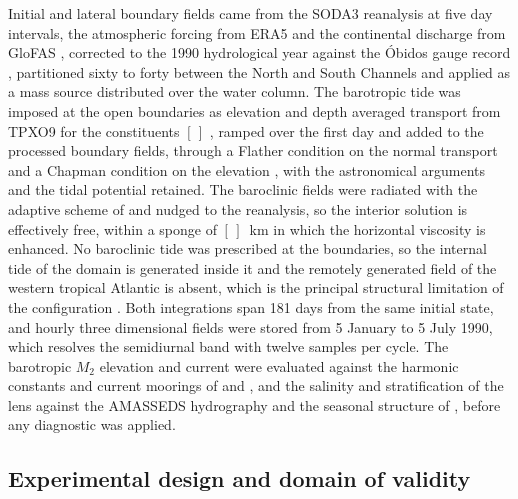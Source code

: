 \documentclass[a4paper,fleqn]{cas-sc}
\begin{document}
Initial and lateral boundary fields came from the SODA3 reanalysis \citep{soda3} at five day intervals, the atmospheric forcing from ERA5 \citep{hersbach2020era5} and the continental discharge from GloFAS \citep{glofas}, corrected to the 1990 hydrological year against the \'Obidos gauge record \citep{alessi:1992,nittrouer:1995,hiban1996}, partitioned sixty to forty between the North and South Channels and applied as a mass source distributed over the water column. The barotropic tide was imposed at the open boundaries as elevation and depth averaged transport from TPXO9 for the constituents $[\,]$ \citep{egbert:2002}, ramped over the first day and added to the processed boundary fields, through a Flather condition on the normal transport and a Chapman condition on the elevation \citep{flather:1976,chapman:1985}, with the astronomical arguments and the tidal potential retained. The baroclinic fields were radiated with the adaptive scheme of \citet{marchesiello:2001} and nudged to the reanalysis, so the interior solution is effectively free, within a sponge of $[\,]$~km in which the horizontal viscosity is enhanced. No baroclinic tide was prescribed at the boundaries, so the internal tide of the domain is generated inside it and the remotely generated field of the western tropical Atlantic is absent, which is the principal structural limitation of the configuration \citep{kerry:2013}. Both integrations span 181 days from the same initial state, and hourly three dimensional fields were stored from 5 January to 5 July 1990, which resolves the semidiurnal band with twelve samples per cycle. The barotropic $M_{2}$ elevation and current were evaluated against the harmonic constants and current moorings of \citet{beardsley:1995} and \citet{alessi:1992}, and the salinity and stratification of the lens against the AMASSEDS hydrography \citep{geyer1996physical} and the seasonal structure of \citet{nascimento:2026}, before any diagnostic was applied.

\subsection{Experimental design and domain of validity}
\label{sec:design}
\end{document}
